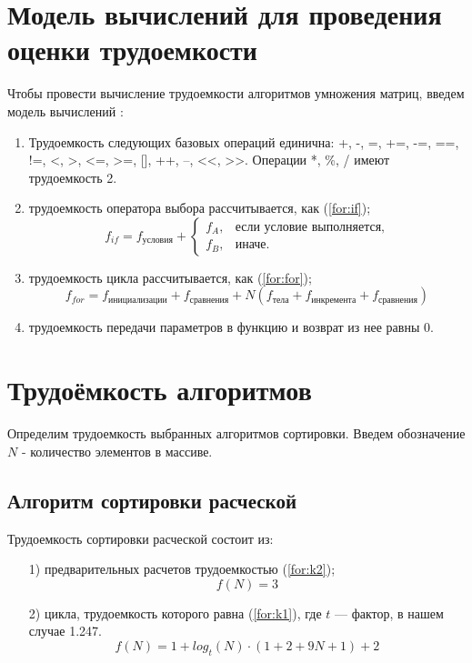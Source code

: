 \clearpage

\section{Модель вычислений для проведения \\
	оценки трудоемкости}
Чтобы провести вычисление трудоемкости алгоритмов умножения матриц, введем модель вычислений \cite{model}:

\begin{enumerate}[label=\arabic*)]
	\item Трудоемкость следующих базовых операций единична:
	+, -, =, +=, -=, ==, !=, <, >, <=, >=, [], ++, --, <<, >>.
	Операции *, \%, / имеют трудоемкость 2.
	\item трудоемкость оператора выбора  рассчитывается, как (\ref{for:if});
	\begin{equation}
		\label{for:if}
		f_{if} = f_{\text{условия}} +
		\begin{cases}
			f_A, & \text{если условие выполняется,}\\
			f_B, & \text{иначе.}
		\end{cases}
	\end{equation}
	\item трудоемкость цикла рассчитывается, как (\ref{for:for});
	\begin{equation}
		\label{for:for}
		f_{for} = f_{\text{инициализации}} + f_{\text{сравнения}} + N(f_{\text{тела}} + f_{\text{инкремента}} + f_{\text{сравнения}})
	\end{equation}
	\item трудоемкость передачи параметров в функцию и возврат из нее равны 0.
\end{enumerate}


\section{Трудоёмкость алгоритмов}

Определим трудоемкость выбранных алгоритмов сортировки. Введем обозначение $N$ - количество элементов в массиве.

\subsection{Алгоритм сортировки расческой}

Трудоемкость сортировки расческой состоит из:
\begin{enumerate}
	\item[1)] предварительных расчетов трудоемкостью (\ref{for:k2});
	\begin{equation}
		\label{for:k2}
		f(N) = 3
	\end{equation}
	\item[2)] цикла, трудоемкость которого равна (\ref{for:k1}), где $t$ --- фактор, в нашем случае 1.247. 
	\begin{equation}
		\label{for:k1}
		f(N) = 1 + log_t(N) \cdot (1 + 2 + 9N + 1) + 2
	\end{equation}
\end{enumerate}


